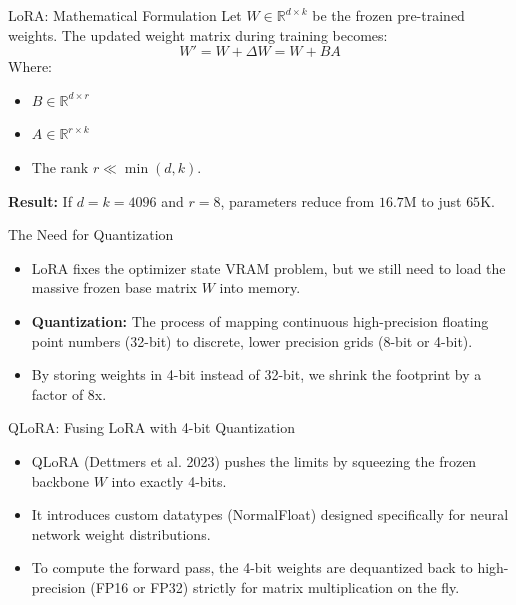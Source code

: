 \documentclass[aspectratio=169]{beamer}
\begin{document}
\begin{frame}{LoRA: Mathematical Formulation}
    Let $W \in \mathbb{R}^{d \times k}$ be the frozen pre-trained weights.
    The updated weight matrix during training becomes:
    \begin{equation}
        W' = W + \Delta W = W + BA
    \end{equation}
    Where:
    \begin{itemize}
        \item $B \in \mathbb{R}^{d \times r}$
        \item $A \in \mathbb{R}^{r \times k}$
        \item The rank $r \ll \min(d, k)$.
    \end{itemize}
    \textbf{Result:} If $d=k=4096$ and $r=8$, parameters reduce from $16.7$M to just $65$K.
\end{frame}

\begin{frame}{The Need for Quantization}
    \begin{itemize}
        \item LoRA fixes the optimizer state VRAM problem, but we still need to load the massive frozen base matrix $W$ into memory.
        \item \textbf{Quantization:} The process of mapping continuous high-precision floating point numbers (32-bit) to discrete, lower precision grids (8-bit or 4-bit).
        \item By storing weights in 4-bit instead of 32-bit, we shrink the footprint by a factor of 8x.
    \end{itemize}
\end{frame}

\begin{frame}{QLoRA: Fusing LoRA with 4-bit Quantization}
    \begin{itemize}
        \item QLoRA (Dettmers et al. 2023) pushes the limits by squeezing the frozen backbone $W$ into exactly 4-bits.
        \item It introduces custom datatypes (NormalFloat) designed specifically for neural network weight distributions.
        \item To compute the forward pass, the 4-bit weights are dequantized back to high-precision (FP16 or FP32) strictly for matrix multiplication on the fly.
    \end{itemize}
\end{frame}
\end{document}

